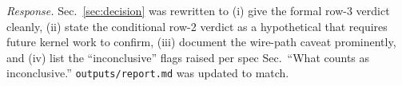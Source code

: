 \documentclass[11pt]{article}
\begin{document}
\emph{Response.}  Sec.~\ref{sec:decision} was rewritten to (i) give
the formal row-3 verdict cleanly, (ii) state the conditional row-2
verdict as a hypothetical that requires future kernel work to confirm,
(iii) document the wire-path caveat prominently, and (iv) list the
``inconclusive'' flags raised per spec Sec.~``What counts as
inconclusive.''  \texttt{outputs/report.md} was updated to match.
\end{document}
